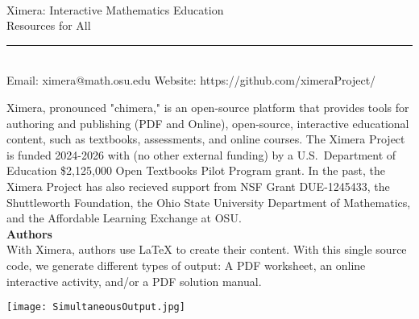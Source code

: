 \documentclass{article}
\begin{document}
\sffamily\flushleft
\hspace{-.3cm}\\
Ximera: Interactive Mathematics Education \\Resources for All\\[.1cm]
\rule{\textwidth}{.1cm}\\[.1cm]\ttfamily
Email: ximera@math.osu.edu \hfill Website:
https://github.com/ximeraProject/\\[1cm]
\begin{multicols}{2}
    Ximera, pronounced "chimera," is an
    open-source platform that provides tools for authoring and publishing
    (PDF and Online), open-source, interactive educational content, such
    as textbooks, assessments, and online courses.
    The Ximera Project is
    funded 2024-2026 with (no other external funding) by a U.S.\ Department of
    Education \$2,125,000
    Open Textbooks Pilot
    Program grant. In the
    past, the Ximera Project has also recieved support from NSF Grant
    DUE-1245433, the Shuttleworth Foundation, the Ohio State University
    Department of Mathematics, and the Affordable Learning Exchange at
    OSU.\\[.5cm]
    {\sffamily\bfseries Authors}\\
    With Ximera, authors use LaTeX to create their content. With this
    single source code, we generate different types of output: A PDF worksheet, an
    online interactive activity, and/or a PDF solution manual.
    \begin{center}
        \texttt{[image: SimultaneousOutput.jpg]}
    \end{center}
    \begin{center}
\end{center}
\end{multicols}
\end{document}
